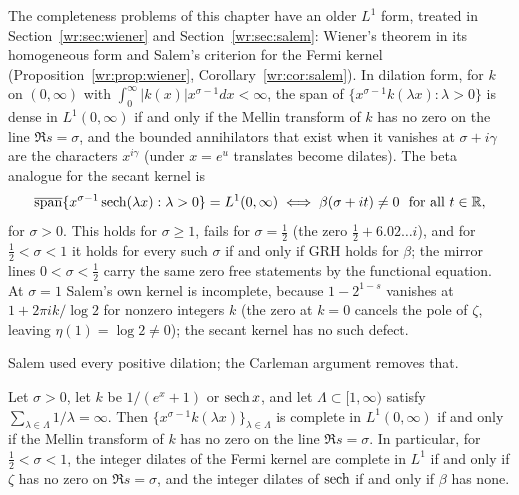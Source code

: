 The completeness problems of this chapter have an older $L^1$ form, treated in Section~\ref{wr:sec:wiener} and Section~\ref{wr:sec:salem}: Wiener's theorem \cite{Wiener32} in its homogeneous form \cite{Kac65} and Salem's criterion \cite{Salem53} for the Fermi kernel (Proposition~\ref{wr:prop:wiener}, Corollary~\ref{wr:cor:salem}). In dilation form, for $k$ on $(0,\infty)$ with $\int_0^\infty|k(x)|x^{\sigma-1}dx<\infty$, the span of $\{x^{\sigma-1}k(\lambda x):\lambda>0\}$ is dense in $L^1(0,\infty)$ if and only if the Mellin transform of $k$ has no zero on the line $\Re s=\sigma$, and the bounded annihilators that exist when it vanishes at $\sigma+i\gamma$ are the characters $x^{i\gamma}$ (under $x=e^u$ translates become dilates). The beta analogue for the secant kernel is
\begin{equation}\label{lv:eq:salem-beta}
\overline{\operatorname{span}}\{x^{\sigma-1}\operatorname{sech}(\lambda x):\lambda>0\}=L^1(0,\infty)\iff\beta(\sigma+it)\ne0\ \text{ for all }t\in\mathbb{R},
\end{equation}
for $\sigma>0$. This holds for $\sigma\ge1$, fails for $\sigma=\frac12$ (the zero $\frac12+6.02\ldots i$), and for $\frac12<\sigma<1$ it holds for every such $\sigma$ if and only if GRH holds for $\beta$; the mirror lines $0<\sigma<\frac12$ carry the same zero free statements by the functional equation. At $\sigma=1$ Salem's own kernel is incomplete, because $1-2^{1-s}$ vanishes at $1+2\pi ik/\log2$ for nonzero integers $k$ (the zero at $k=0$ cancels the pole of $\zeta$, leaving $\eta(1)=\log2\ne0$); the secant kernel has no such defect.

Salem used every positive dilation; the Carleman argument removes that.

\begin{theorem}\label{lv:thm:salem}
Let $\sigma>0$, let $k$ be $1/(e^x+1)$ or $\operatorname{sech} x$, and let $\Lambda\subset[1,\infty)$ satisfy $\sum_{\lambda\in\Lambda}1/\lambda=\infty$. Then $\{x^{\sigma-1}k(\lambda x)\}_{\lambda\in\Lambda}$ is complete in $L^1(0,\infty)$ if and only if the Mellin transform of $k$ has no zero on the line $\Re s=\sigma$. In particular, for $\frac12<\sigma<1$, the integer dilates of the Fermi kernel are complete in $L^1$ if and only if $\zeta$ has no zero on $\Re s=\sigma$, and the integer dilates of $\operatorname{sech}$ if and only if $\beta$ has none.
\end{theorem}


